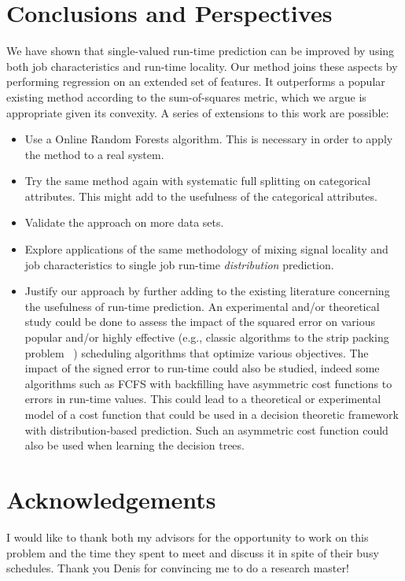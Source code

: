 \documentclass{article}
\begin{document}

    \section{Conclusions and Perspectives}
    \label{sec:ccl}
    We have shown that single-valued run-time prediction can be improved by using both job characteristics and run-time locality. Our method joins these aspects by performing regression on an extended set of features. It outperforms a popular existing method according to the sum-of-squares metric, which we argue is appropriate given its convexity.
    A series of extensions to this work are possible:
    \begin{itemize}
      \item Use a Online Random Forests algorithm. This is necessary in order to apply the method to a real system.
      \item Try the same method again with systematic full splitting on categorical attributes. This might add to the usefulness of the categorical attributes.
      \item Validate the approach on more data sets.
      \item Explore applications of the same methodology of mixing signal locality and job characteristics to single job run-time \textit{distribution} prediction.
      \item Justify our approach by further adding to the existing literature concerning the usefulness of run-time prediction. An experimental and/or theoretical study could be done to assess the impact of the squared error on various popular and/or highly effective (e.g., classic algorithms to the strip packing problem ~\cite{handbook-of-scheduling}) scheduling algorithms that optimize various objectives. The impact of the signed error to run-time could also be studied, indeed some algorithms such as FCFS with backfilling have asymmetric cost functions to errors in run-time values. This could lead to a theoretical or experimental model of a cost function that could be used in a decision theoretic framework with distribution-based prediction. Such an asymmetric cost function could also be used when learning the decision trees.
    \end{itemize}

    \section{Acknowledgements}
    \label{sec:ack}
    I would like to thank both my advisors for the opportunity to work on this problem and the time they spent to meet and discuss it in spite of their busy schedules. Thank you Denis for convincing me to do a research master!


    
    

    
\end{document}
